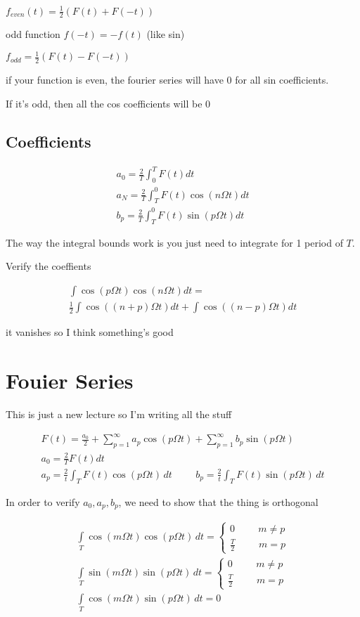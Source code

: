 \documentclass[fleqn]{report}
\newcommand{\hp}{\hspace{1cm}}
\newcommand{\equations} [1] {
\begin{gather*}
#1
\end{gather*}
}
\begin{document}
$f_{even}(t) = \frac{1}{2} (F(t) + F(-t))$

odd function $f(-t) = - f(t)$ (like sin)

$f_{odd} = \frac{1}{2} (F(t) - F(-t))$

if your function is even, the fourier series will have 0 for all sin coefficients.

If it's odd, then all the cos coefficients will be 0

\subsection{Coefficients}
\equations{
    a_0 = \frac{2}{T} \int^T_0 F(t) dt 
    \\
    a_N = \frac{2}{T} \int^0_T F(t) \cos(n \Omega t) dt 
    \\
    b_p = \frac{2}{T} \int^0_T F(t) \sin(p \Omega t) dt 
}
The way the integral bounds work is you just need to integrate for 1 period of $T$.

Verify the coeffients 

\equations{
    \int \cos(p \Omega t) \cos(n \Omega t) dt 
    =
    \\
    \frac{1}{2} \int \cos((n + p) \Omega t) dt  + 
    \int \cos((n - p) \Omega t) dt 
}
it vanishes so I think something's good 

\section{Fouier Series}
This is just a new lecture so I'm writing all the stuff 

\equations{
    F(t) = 
    \frac{a_0}{2} + 
    \sum^\infty_{p = 1} a_p \cos(p \Omega t)
    + \sum^\infty_{p = 1} b_p \sin(p \Omega t)
    \\
    a_0 = \frac{2}{T} F(t) dt 
    \\
    a_p = \frac{2}{t} \int_T F(t) \cos(p \Omega t) \, dt 
    \hp 
    b_p = \frac{2}{t} \int_T F(t) \sin(p \Omega t) \, dt 
}
In order to verify $a_0, a_p, b_p$, we need to show that the thing is orthogonal 

\equations{
    \int \limits_T \cos(m \Omega t) \cos(p \Omega t) \, dt = 
    \begin{cases}
    0 \hp m \neq p \\
    \frac{T}{2} \hp m = p
    \end{cases}
    \\
    \int \limits_T \sin(m \Omega t) \sin(p \Omega t) \, dt = 
    \begin{cases}
    0 \hp m \neq p \\
    \frac{T}{2} \hp m = p
    \end{cases}
    \\
    \int \limits_T \cos(m \Omega t) \sin(p \Omega t) \, dt = 0
}
\end{document}
